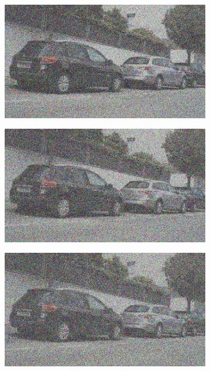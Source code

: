 \documentclass[a4paper]{ctexart}
\begin{document}
\begin{figure}[htbp]
\begin{subfigure}{0.08\textwidth}
			\label{fig：Gamma=0.7, Gauss Noise = 0.7}
		\end{subfigure}
		\begin{subfigure}{0.08\textwidth}
			\captionsetup{font=scriptsize}
			\includegraphics[width=\linewidth]{picture/Edge Detection/degrade/RGB_001 Gamma=0.7, Gauss Noise=0.8}
			\label{fig：Gamma=0.7, Gauss Noise = 0.8}
		\end{subfigure}
		\begin{subfigure}{0.08\textwidth}
			\captionsetup{font=scriptsize}
			\includegraphics[width=\linewidth]{picture/Edge Detection/degrade/RGB_001 Gamma=0.7, Gauss Noise=0.9}
			\label{fig：Gamma=0.7, Gauss Noise = 0.9}
		\end{subfigure}
		\begin{subfigure}{0.08\textwidth}
			\captionsetup{font=scriptsize}
			\includegraphics[width=\linewidth]{picture/Edge Detection/degrade/RGB_001 Gamma=0.7, Gauss Noise=1.0}

\end{subfigure}
\end{figure}
\end{document}

